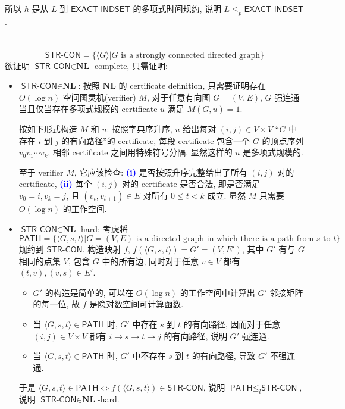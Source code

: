 \documentclass[8pt]{article}
\theoremstyle{compact}
\def\num#1{\textnormal{\textbf{\mbox{\textcolor{blue}{(#1)}}}}}
\def\le{\leqslant}
\begin{document}
所以 $h$ 是从 $L$ 到 $\textsf{EXACT-INDSET}$ 的多项式时间规约, 说明 $L \le_p \textsf{EXACT-INDSET}$.

\section{}
$$\textsf{STR-CON} = \{\langle G \rangle | G \text{ is a strongly connected directed graph}\}$$
欲证明 $\textsf{STR-CON} \in \textbf{NL}$-complete, 只需证明:
\begin{itemize}
	\item $\textsf{STR-CON} \in \textbf{NL}$: 按照 $\textbf{NL}$ 的 certificate definition, 只需要证明存在 $O(\log n)$ 空间图灵机(verifier) $M$, 对于任意有向图 $G = (V, E)$, $G$ 强连通当且仅当存在多项式规模的 certificate $u$ 满足 $M(G, u) = 1$.
	
	按如下形式构造 $M$ 和 $u$: 按照字典序升序, $u$ 给出每对 $(i, j) \in V \times V$ “$G$ 中存在 $i$ 到 $j$ 的有向路径”的 certificate, 每段 certificate 包含一个 $G$ 的顶点序列 $v_0v_1 \cdots v_k$, 相邻 certificate 之间用特殊符号分隔. 显然这样的 $u$ 是多项式规模的.

	至于 verifier $M$, 它应该检查: \num{i} 是否按照升序完整给出了所有 $(i, j)$ 对的 certificate, \num{ii} 每个 $(i, j)$ 对的 certificate 是否合法, 即是否满足 $v_0 = i, v_k = j$, 且 $(v_t, v_{t + 1}) \in E$ 对所有 $0 \le t < k$ 成立. 显然 $M$ 只需要 $O(\log n)$ 的工作空间.

	\item $\textsf{STR-CON} \in \textbf{NL}$-hard: 考虑将 $$\textsf{PATH} = \{\langle G, s, t \rangle | G = (V, E) \text{ is a directed graph in which there is a path from } s \text{ to } t\}$$ 规约到 $\textsf{STR-CON}$. 构造映射 $f$, $f(\langle G, s, t \rangle) = G' = (V, E')$, 其中 $G'$ 有与 $G$ 相同的点集 $V$, 包含 $G$ 中的所有边, 同时对于任意 $v \in V$ 都有 $(t, v), (v, s) \in E'$.
	\begin{itemize}
		\item $G'$ 的构造是简单的, 可以在 $O(\log n)$ 的工作空间中计算出 $G'$ 邻接矩阵的每一位, 故 $f$ 是隐对数空间可计算函数.
		\item 当 $\langle G, s, t \rangle \in \textsf{PATH}$ 时, $G'$ 中存在 $s$ 到 $t$ 的有向路径, 因而对于任意 $(i, j) \in V \times V$ 都有 $i \to s \to t \to j$ 的有向路径, 说明 $G'$ 强连通.
		\item 当 $\langle G, s, t \rangle \in \textsf{PATH}$ 时, $G'$ 中不存在 $s$ 到 $t$ 的有向路径, 导致 $G'$ 不强连通.
	\end{itemize}

	于是 $\langle G, s, t \rangle \in \textsf{PATH} \Leftrightarrow f(\langle G, s, t \rangle) \in \textsf{STR-CON}$, 说明 $\textsf{PATH} \le_l \textsf{STR-CON}$, 说明 $\textsf{STR-CON} \in \textbf{NL}$-hard.
\end{itemize}
\end{document}
